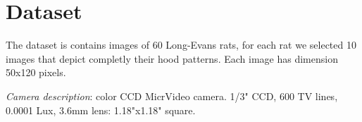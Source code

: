 \documentclass[conference]{IEEEtran}
\begin{document}



\section{Dataset}

The dataset is contains images of 60 Long-Evans rats, for each rat we 
selected 10 images that depict completly their hood patterns. Each image has dimension 50x120 pixels.

\textit{Camera description}: color CCD MicrVideo camera. 1/3" CCD, 600 TV lines, 0.0001 Lux, 3.6mm lens: 1.18"x1.18" square.
\end{document}
